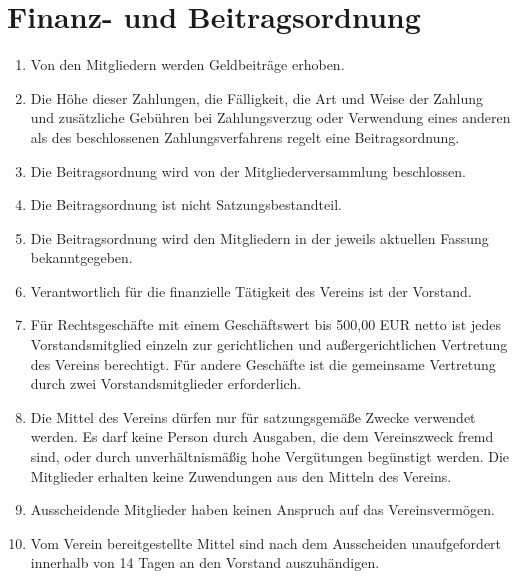 \documentclass[12pt,a4paper,draft]{article}
\begin{document}
\section{Finanz- und Beitragsordnung} %
\begin{enumerate}
\item Von den Mitgliedern werden Geldbeiträge erhoben.

\item Die Höhe dieser Zahlungen, die Fälligkeit, die Art und Weise der Zahlung 
und zusätzliche Gebühren bei Zahlungsverzug oder Verwendung eines anderen als 
des beschlossenen Zahlungsverfahrens regelt eine Beitragsordnung.

\item Die Beitragsordnung wird von der Mitgliederversammlung beschlossen.

\item Die Beitragsordnung ist nicht Satzungsbestandteil.

\item Die Beitragsordnung wird den Mitgliedern in der jeweils aktuellen Fassung 
bekanntgegeben.

\item Verantwortlich für die finanzielle Tätigkeit des Vereins ist der 
Vorstand.

\item Für Rechtsgeschäfte mit einem Geschäftswert bis 500,00 EUR netto ist 
jedes Vorstandsmitglied einzeln zur gerichtlichen und außergerichtlichen 
Vertretung des Vereins berechtigt. Für andere Geschäfte ist die gemeinsame 
Vertretung durch zwei Vorstandsmitglieder erforderlich.


\item Die Mittel des Vereins dürfen nur für satzungsgemäße Zwecke verwendet 
werden. Es darf keine Person durch Ausgaben, die dem Vereinszweck fremd sind, 
oder durch unverhältnismäßig hohe Vergütungen begünstigt werden. Die Mitglieder 
erhalten keine Zuwendungen aus den Mitteln des Vereins.

\item Ausscheidende Mitglieder haben keinen Anspruch auf das Vereinsvermögen.

\item Vom Verein bereitgestellte Mittel sind nach dem Ausscheiden 
unaufgefordert innerhalb von 14 Tagen an den Vorstand auszuhändigen.


\end{enumerate}
\end{document}
